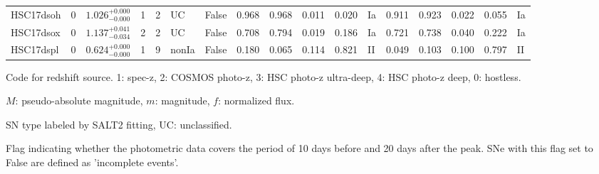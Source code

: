 \documentclass[useamsfonts]{pasj01}
\begin{document}
\begin{table}[htbp]
{\begin{tabular}{p{4.5em}p{1.2em}p{4.0em}p{2.1em}|p{0.6em}p{1.8em}p{3.0em}|p{2.9em}|p{1.2em}p{1.2em}p{1.2em}p{0.6em}|p{2.9em}|p{1.2em}p{1.2em}p{1.2em}p{0.6em}}
HSC17dsoh &     0 &    $1.026_{-0.000}^{+0.000}$ &         1 &    2 &  UC &   False &    0.968 &    0.968 &    0.011 &    0.020 &      Ia &    0.911 &    0.923 &    0.022 &    0.055 &      Ia \\
HSC17dsox &     0 &    $1.137_{-0.034}^{+0.041}$ &         2 &    2 &  UC &   False &    0.708 &    0.794 &    0.019 &    0.186 &      Ia &    0.721 &    0.738 &    0.040 &    0.222 &      Ia \\
HSC17dspl &     0 &    $0.624_{-0.000}^{+0.000}$ &         1 &    9 &  nonIa &   False &    0.180 &    0.065 &    0.114 &    0.821 &      II &    0.049 &    0.103 &    0.100 &    0.797 &      II \\
\hline
\end{tabular}
}\label{tab:h_results}
\begin{tabnote}
\footnotemark[$*$] Code for redshift source.
1: spec-z, 2: COSMOS photo-z, 3: HSC photo-z ultra-deep, 4: HSC photo-z deep, 0: hostless.

\footnotemark[$\dagger$] $M$: pseudo-absolute magnitude, $m$: magnitude, $f$: normalized flux.

\footnotemark[$\ddagger$] SN type labeled by SALT2 fitting, UC: unclassified.

\footnotemark[$\S$] Flag indicating whether the photometric data covers the period of 10 days before and 20 days after the peak. SNe with this flag set to False are defined as 'incomplete events'.
\end{tabnote}
\end{table}
%
%
\end{document}

